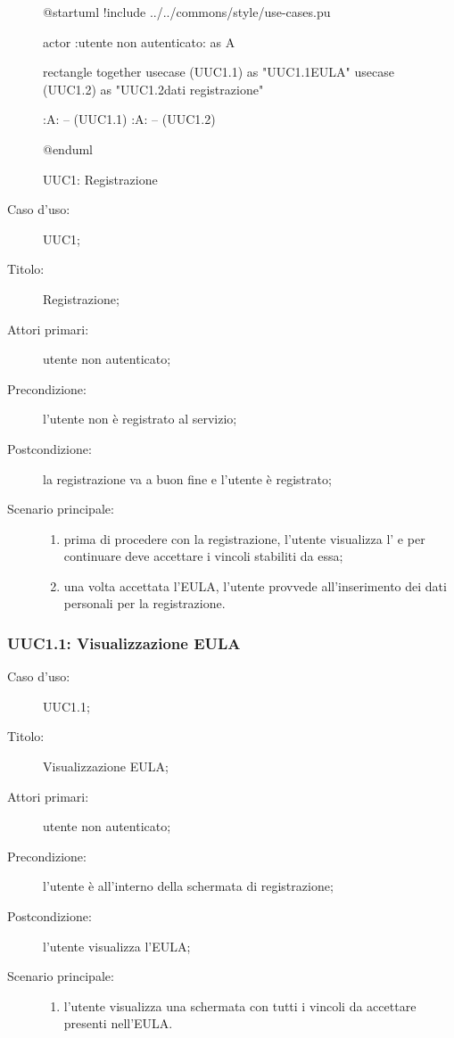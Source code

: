 \documentclass[components/casi-duso-app]{subfiles}
\begin{document}
\begin{figure}[H]
  \centering
  \begin{plantuml}
  @startuml
  !include ../../commons/style/use-cases.pu

  actor :utente non autenticato: as A

  rectangle {
    together {
      usecase (UUC1.1) as "UUC1.1\nVisualizzazione EULA"
      usecase (UUC1.2) as "UUC1.2\nInserimento dati registrazione"
    }
  }

  :A: -- (UUC1.1)
  :A: -- (UUC1.2)

  @enduml
  \end{plantuml}
  \caption{UUC1: Registrazione}%
  \label{fig:uuc1}
\end{figure}

\begin{description}
  \item[Caso d’uso:] UUC1;
  \item[Titolo:] Registrazione;
  \item[Attori primari:] utente non autenticato;
  \item[Precondizione:] l'utente non è registrato al servizio;
  \item[Postcondizione:] la registrazione va a buon fine e l'utente è registrato;
  \item[Scenario principale:]
        \begin{enumerate}
          \item prima di procedere con la registrazione, l'utente visualizza l' e per continuare deve accettare i vincoli stabiliti da essa;
          \item una volta accettata l'EULA, l'utente provvede all'inserimento dei dati personali per la registrazione.
        \end{enumerate}
\end{description}


\subsubsection{UUC1.1: Visualizzazione EULA}%
\label{subs:UUC1.1}
\begin{description}
  \item[Caso d’uso:] UUC1.1;
  \item[Titolo:] Visualizzazione EULA;
  \item[Attori primari:] utente non autenticato;
  \item[Precondizione:] l'utente è all'interno della schermata di registrazione;
  \item[Postcondizione:] l'utente visualizza l'EULA;
  \item[Scenario principale:]
        \begin{enumerate}
          \item l'utente visualizza una schermata con tutti i vincoli da accettare presenti nell'EULA.
        \end{enumerate}
\end{description}
\end{document}
